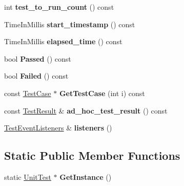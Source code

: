 \begin{DoxyCompactItemize}
int {\bfseries test\+\_\+to\+\_\+run\+\_\+count} () const
\item 
\mbox{\label{classtesting_1_1UnitTest_a3d83fe1cc5570a1c34f9754b0f56d65f}} 
Time\+In\+Millis {\bfseries start\+\_\+timestamp} () const
\item 
\mbox{\label{classtesting_1_1UnitTest_acf608411a17cb3b40a1e9d724f262b3b}} 
Time\+In\+Millis {\bfseries elapsed\+\_\+time} () const
\item 
\mbox{\label{classtesting_1_1UnitTest_a7c9b327bc14cb8a282c789dc6513a55b}} 
bool {\bfseries Passed} () const
\item 
\mbox{\label{classtesting_1_1UnitTest_a706f29e765916616b11a271a65948727}} 
bool {\bfseries Failed} () const
\item 
\mbox{\label{classtesting_1_1UnitTest_a724d4c8be4481e0c1523a22b72dc7dac}} 
const \hyperlink{classtesting_1_1TestCase}{Test\+Case} $\ast$ {\bfseries Get\+Test\+Case} (int i) const
\item 
\mbox{\label{classtesting_1_1UnitTest_aa59dde4c3dc43a920ed142a27670686c}} 
const \hyperlink{classtesting_1_1TestResult}{Test\+Result} \& {\bfseries ad\+\_\+hoc\+\_\+test\+\_\+result} () const
\item 
\mbox{\label{classtesting_1_1UnitTest_aac10085cf7c0d1751306db10cdd953cb}} 
\hyperlink{classtesting_1_1TestEventListeners}{Test\+Event\+Listeners} \& {\bfseries listeners} ()
\end{DoxyCompactItemize}
\subsection*{Static Public Member Functions}
\begin{DoxyCompactItemize}
\item 
\mbox{\label{classtesting_1_1UnitTest_a24192400b70b3b946746954e9574fb8e}} 
static \hyperlink{classtesting_1_1UnitTest}{Unit\+Test} $\ast$ {\bfseries Get\+Instance} ()
\end{DoxyCompactItemize}

